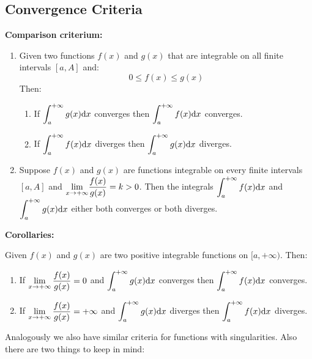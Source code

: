 \documentclass[12pt]{article}
\begin{document}
\subsection{Convergence Criteria}
\textbf{Comparison criterium:}
\begin{enumerate}
    \item Given two functions $f(x)$ and $g(x)$ that are integrable on all finite intervals $[a,A]$ and:
    \begin{equation*}
        0 \leq f(x) \leq g(x)
    \end{equation*}
    Then:
    \begin{enumerate}
        \item If $\mathlarger{\int_a^{+ \infty}g(x) \dd x}$ converges then $\mathlarger{\int_a^{+ \infty}f(x) \dd x}$ converges.
        \item If $\mathlarger{\int_a^{+ \infty}f(x) \dd x}$ diverges then $\mathlarger{\int_a^{+ \infty}g(x) \dd x}$ diverges.
    \end{enumerate}
    \item Suppose $f(x)$ and $g(x)$ are functions integrable on every finite intervals $[a,A]$ and $\mathlarger{\lim_{x \rightarrow + \infty}} \dfrac{f(x)}{g(x)} = k>0$. Then the integrals $\mathlarger{\int_a^{+\infty}f(x) \dd x}$ and $\mathlarger{\int_a^{+\infty}g(x) \dd x}$ either both converges or both diverges.
\end{enumerate}
\textbf{Corollaries:}
\par Given $f(x)$ and $g(x)$ are two positive integrable functions on $[a,+\infty)$. Then:
\begin{enumerate}
    \item If $\mathlarger{\lim_{x \rightarrow + \infty} \dfrac{f(x)}{g(x)} = 0 }$ and $\mathlarger{\int_a^{+\infty}g(x) \dd x}$ converges then $\mathlarger{\int_a^{+\infty}f(x) \dd x}$ converges.
    \item If $\mathlarger{\lim_{x \rightarrow + \infty} \dfrac{f(x)}{g(x)} = +\infty }$ and $\mathlarger{\int_a^{+\infty}g(x) \dd x}$ diverges then $\mathlarger{\int_a^{+\infty}f(x) \dd x}$ diverges.
\end{enumerate}
Analogously we also have similar criteria for functions with singularities. Also there are two things to keep in mind:
\end{document}
